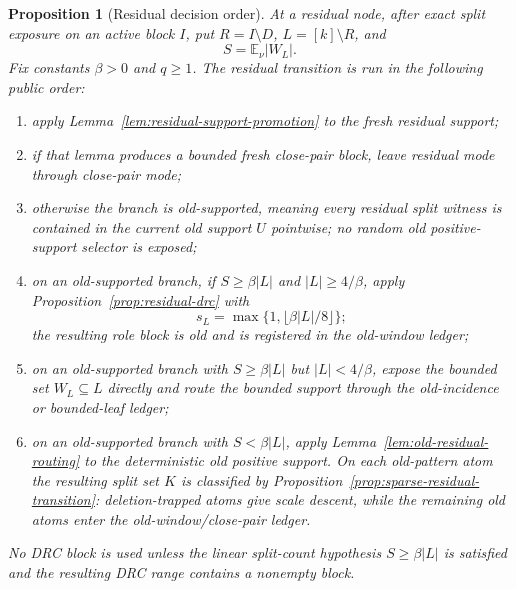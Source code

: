 \documentclass[11pt]{article}
\newtheorem{proposition}[theorem]{Proposition}
\newcommand{\EE}{\mathbb E}
\begin{document}
\begin{proposition}[Residual decision order]
\label{prop:residual-decision-order}
At a residual node, after exact split exposure on an active block $I$, put
$R=I\setminus D$, $L=[k]\setminus R$, and
\[
  S=\EE_\nu |W_L|.
\]
Fix constants $\beta>0$ and $q\ge1$.  The residual transition is run in the
following public order:
\begin{enumerate}[label=\textup{(\roman*)}]
\item apply Lemma~\ref{lem:residual-support-promotion} to the fresh residual
support;
\item if that lemma produces a bounded fresh close-pair block, leave residual
mode through close-pair mode;
\item otherwise the branch is old-supported, meaning every residual split
witness is contained in the current old support $U$ pointwise; no random old
positive-support selector is exposed;
\item on an old-supported branch, if $S\ge\beta |L|$ and
$|L|\ge4/\beta$, apply Proposition~\ref{prop:residual-drc} with
\[
  s_L=\max\{1,\lfloor\beta |L|/8\rfloor\};
\]
the resulting role block is old and is registered in the old-window ledger;
\item on an old-supported branch with $S\ge\beta |L|$ but $|L|<4/\beta$, expose
the bounded set $W_L\subseteq L$ directly and route the bounded support through
the old-incidence or bounded-leaf ledger;
\item on an old-supported branch with $S<\beta |L|$, apply
Lemma~\ref{lem:old-residual-routing} to the deterministic old positive
support.
On each old-pattern atom the resulting split set $K$ is classified by
Proposition~\ref{prop:sparse-residual-transition}: deletion-trapped atoms give
scale descent, while the remaining old atoms enter the old-window/close-pair
ledger.
\end{enumerate}
No DRC block is used unless the linear split-count hypothesis
$S\ge\beta |L|$ is satisfied and the resulting DRC range contains a nonempty
block.
\end{proposition}
\end{document}
